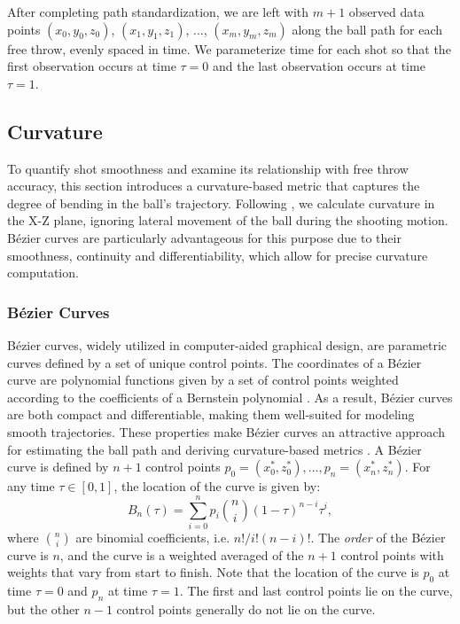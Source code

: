 \documentclass{article}
\begin{document}
      After completing path standardization, we are left with $m + 1$ observed data points \((x_0, y_0, z_0)\), \((x_1, y_1, z_1)\), ..., \((x_m, y_m, z_m)\) along the ball path for each free throw, evenly spaced in time. We parameterize time for each shot so that the first observation occurs at time $\tau = 0$ and the last observation occurs at time $\tau = 1$.

    \subsection{Curvature}
    \label{sec:curvature}
    
    To quantify shot smoothness and examine its relationship with free throw accuracy, this section introduces a curvature-based metric that captures the degree of bending in the ball's trajectory. Following \citet{slegers_role_2024}, we calculate curvature in the X-Z plane, ignoring lateral movement of the ball during the shooting motion. Bézier curves are particularly advantageous for this purpose due to their smoothness, continuity and differentiability, which allow for precise curvature computation. 

        \subsubsection{Bézier Curves}

            Bézier curves, widely utilized in computer-aided graphical design, are parametric curves defined by a set of unique control points. The coordinates of a Bézier curve are polynomial functions given by a set of control points weighted according to the coefficients of a Bernstein polynomial \citep{baydas_defining_2019}. As a result, Bézier curves are both compact and differentiable, making them well-suited for modeling smooth trajectories. These properties make Bézier curves an attractive approach for estimating the ball path and deriving curvature-based metrics \citep{slegers_role_2024}. A Bézier curve is defined by \(n + 1\) control points \(p_0 = (x_0^*, z_0^*), ..., p_n = (x_n^*, z_n^*)\). For any time \(\tau \in [0, 1]\), the location of the curve is given by:
            \begin{equation}
              \label{eqn:bezier}
              B_n(\tau) = \sum_{i=0}^{n} p_i \binom{n}{i} (1 - \tau)^{n-i} \tau^i,
            \end{equation}
            where \( \binom{n}{i} \) are binomial coefficients, i.e. $n! / i! (n - i)!$. The {\it order} of the Bézier curve is \(n\), and the curve is a weighted averaged of the \(n+1\) control points with weights that vary from start to finish. Note that the location of the curve is \(p_0\) at time \(\tau =0\) and \(p_n\) at time \(\tau=1\). The first and last control points lie on the curve, but the other \(n - 1\) control points generally do not lie on the curve.
\end{document}
